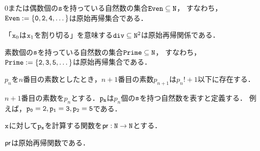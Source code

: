 \begin{myTheorem}[偶数の集合]
  0または偶数個の$\mathtt{s}$を持っている自然数の集合$\mathtt{Even} \subseteq \mathtt{N}$，
  すなわち，$\mathtt{Even} := \{\mathtt{0}, \mathtt{2}, \mathtt{4},\dots\}$は原始再帰集合である．
\end{myTheorem}

\begin{myTheorem}[約数関係]
  「$\mathtt{x}_0$は$\mathtt{x}_1$を割り切る」を意味する$\mathtt{div} \subseteq \mathtt{N}^2$は原始再帰関係である．
\end{myTheorem}

\begin{myTheorem}[素数の集合]
  素数個の$\mathtt{s}$を持っている自然数の集合$\mathtt{Prime} \subseteq \mathtt{N}$，
  すなわち，$\mathtt{Prime} := \{\mathtt{2}, \mathtt{3}, \mathtt{5},\dots\}$は原始再帰集合である．
\end{myTheorem}

\begin{myTheorem}[素数の探索範囲の上界]
  $p_n$を$n$番目の素数としたとき，$n+1$番目の素数$p_{n+1}$は$p_n! + 1$以下に存在する．
\end{myTheorem}

\begin{myDefinition}[形式的の素数]
  $n+1$番目の素数を$p_n$とする．$\mathtt{p_n}$は$p_n$個の$\mathtt{s}$を持つ自然数を表すと定義する．
  例えば，$\mathtt{p_0} = \mathtt{2}, \mathtt{p_1} = \mathtt{3}, \mathtt{p_2} = \mathtt{5}$である．
\end{myDefinition}

\begin{myDefinition}
  $\mathtt{x}$に対して$\mathtt{p_x}$を計算する関数を$\mathsf{pr}:\mathtt{N} \to \mathtt{N}$とする．
\end{myDefinition}

\begin{myTheorem}
  $\mathsf{pr}$は原始再帰関数である．
\end{myTheorem}
